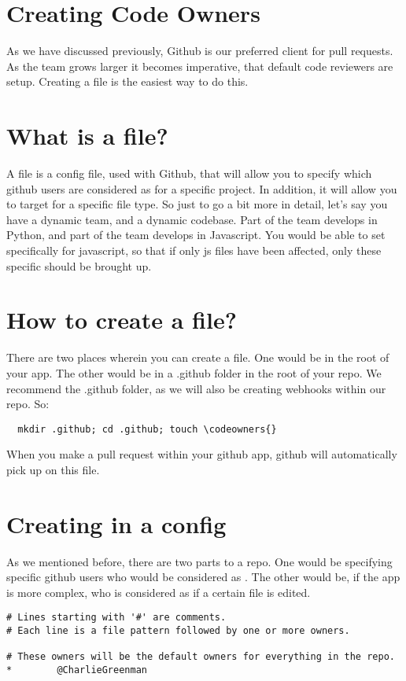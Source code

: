 \maketitle{}
\section{ Creating Code Owners }

As we have discussed previously, Github is our preferred client for pull
requests. As the team grows larger it becomes imperative, that default code
reviewers are setup. Creating a \codeowners{} file is the easiest way to do this.

\section{ What is a \codeowners{} file? }
A \codeowners{} file is a config file, used with Github, that will allow you to
specify which github users are considered as \codeowners{} for a specific project.
In addition, it will allow you to target \codeowners{} for a specific file type.
So just to go a bit more in detail, let's say you have a dynamic team, and a
dynamic codebase. Part of the team develops in Python, and part of the team
develops in Javascript. You would be able to set \codeowners{} specifically for
javascript, so that if only js files have been affected, only these specific
\codeowners{} should be brought up.

\section{ How to create a \codeowners{} file? }
There are two places wherein you can create a \codeowners{} file. One would be
in the root of your app. The other would be in a .github folder in the root of
your repo. We recommend the .github folder, as we will also be creating webhooks
within our repo. So:
\begin{verbatim}
  mkdir .github; cd .github; touch \codeowners{}
\end{verbatim}
When you make a pull request within your github app, github will automatically
pick up on this file.

\section{ Creating \codeowners{} in a \codeowners{} config }
As we mentioned before, there are two parts to a \codeowners{} repo. One would
be specifying specific github users who would be considered as \codeowners{}.
The other would be, if the app is more complex, who is considered as
\codeowners{} if a certain file is edited.

\begin{lstlisting}
# Lines starting with '#' are comments.
# Each line is a file pattern followed by one or more owners.

# These owners will be the default owners for everything in the repo.
*        @CharlieGreenman

\end{lstlisting}
